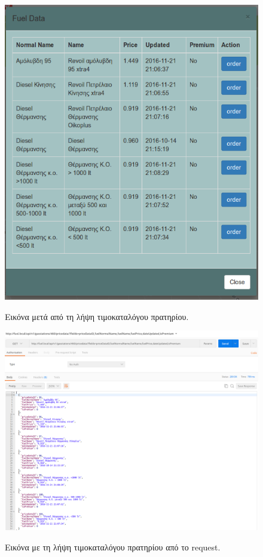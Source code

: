 \begin{figure}[H]
  \caption{Εικόνα μετά από τη λήψη τιμοκαταλόγου πρατηρίου.}
  \centering
    \includegraphics[width=1\textwidth]{img/pricedata2.png}
    \label{fig:pricedata2}
\end{figure}

\begin{figure}[H]
  \caption{Εικόνα με τη λήψη τιμοκαταλόγου πρατηρίου  από το request.}
  \centering
    \includegraphics[width=1\textwidth]{img/pricedata3.png}
    \label{fig:pricedata3}
\end{figure}

